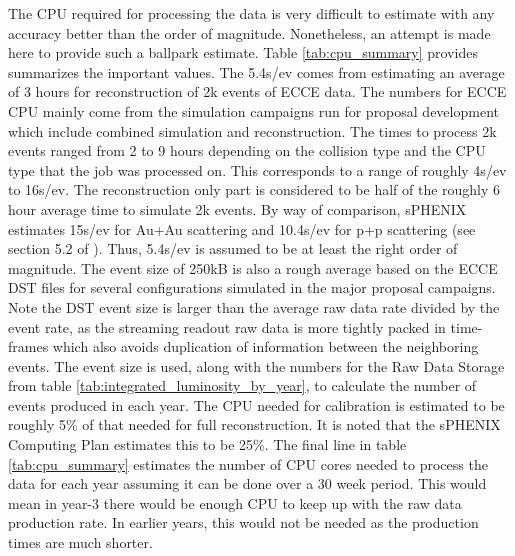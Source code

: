 The CPU required for processing the data is very difficult to estimate with any accuracy better than the order of magnitude. Nonetheless, an attempt is made here to provide such a ballpark estimate. Table \ref{tab:cpu_summary} provides summarizes the important values. The 5.4s/ev comes from estimating an average of 3 hours for reconstruction of 2k events of ECCE data. The numbers for ECCE CPU mainly come from the simulation campaigns run for proposal development which include combined simulation and reconstruction. The times to process 2k events ranged from 2 to 9 hours depending on the collision type and the CPU type that the job was processed on. This corresponds to a range of roughly 4s/ev to 16s/ev. The reconstruction only part is considered to be half of the roughly 6 hour average time to simulate 2k events. By way of comparison, sPHENIX estimates 15s/ev for Au+Au scattering and 10.4s/ev for p+p scattering (see section 5.2 of \cite{sphenix_computing_plan_2019}). Thus, 5.4s/ev is assumed to be at least the right order of magnitude. The event size of 250kB is also a rough average based on the ECCE DST files for several configurations simulated in the major proposal campaigns. Note the DST event size is larger than the average raw data rate divided by the event rate, as the streaming readout raw data is more tightly packed in time-frames which also avoids duplication of information between the neighboring events. The event size is used, along with the numbers for the Raw Data Storage from table \ref{tab:integrated_luminosity_by_year}, to calculate the number of events produced in each year. The CPU needed for calibration is estimated to be roughly 5\% of that needed for full reconstruction. It is noted that the sPHENIX Computing Plan estimates this to be 25\%. The final line in table \ref{tab:cpu_summary} estimates the number of CPU cores needed to process the data for each year assuming it can be done over a 30 week period. This would mean in year-3 there would be enough CPU to keep up with the raw data production rate. In earlier years, this would not be needed as the production times are much shorter.

